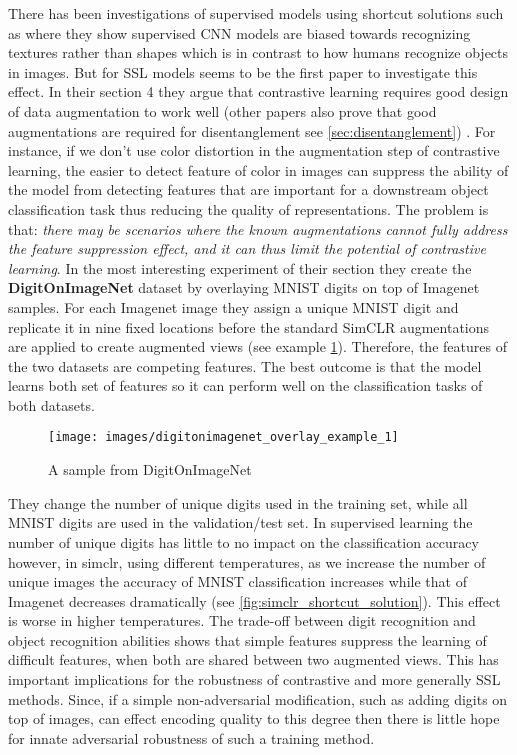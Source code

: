 \documentclass[../thesis.tex]{subfiles}
\begin{document}
	There has been investigations of supervised models using shortcut solutions such as \cite{supervised_texture_bias} where they show supervised CNN models are biased towards recognizing textures rather than shapes which is in contrast to how humans recognize objects in images. But for SSL models \cite{contrastive_loss_shortcut_solutions} seems to be the first paper to investigate this effect. In their section 4 they argue that contrastive learning requires good design of data augmentation to work well (other papers also prove that good augmentations are required for disentanglement see \ref{sec:disentanglement}) . For instance, if we don't use color distortion in the augmentation step of contrastive learning, the easier to detect feature of color in images can suppress the ability of the model from detecting features that are important for a downstream object classification task thus reducing the quality of representations. The problem is that: \textit{there may be scenarios where the known augmentations
cannot fully address the feature suppression effect, and it can thus limit the potential of contrastive
	learning}. In the most interesting experiment of their section they create the \textbf{DigitOnImageNet} dataset by overlaying MNIST digits on top of Imagenet samples. For each Imagenet image they assign a unique MNIST digit and replicate it in nine fixed locations before the standard SimCLR augmentations are applied to
create augmented views (see example \ref{fig:digitonimagenetoverlayexample1}). Therefore, the features of the two datasets are competing features. The best outcome is that the model learns both set of features so it can perform well on the classification tasks of both datasets.
	
	\begin{figure}
		\centering
		\texttt{[image: images/digitonimagenet\_overlay\_example\_1]}
		\caption{A sample from DigitOnImageNet}
		\label{fig:digitonimagenetoverlayexample1}
	\end{figure}

	 
	
	They change the number of unique digits used in the training set, while all MNIST digits are used in the validation/test set. In supervised learning the number of unique digits has little to no impact on the classification accuracy however, in simclr, using different temperatures, as we increase the number of unique images the accuracy of MNIST classification increases while that of Imagenet decreases dramatically (see \ref{fig:simclr_shortcut_solution}). This effect is worse in higher temperatures. The trade-off between digit recognition  and object recognition abilities shows
that simple features suppress the learning of difficult features, when both are shared between two augmented views. This has important implications for the robustness of contrastive and more generally SSL methods. Since, if a simple non-adversarial modification, such as adding digits on top of images, can effect encoding quality to this degree then there is little hope for innate adversarial robustness of such a training method. 
	
\end{document}
